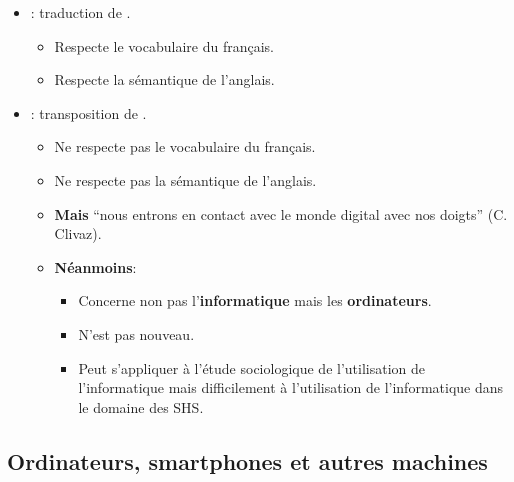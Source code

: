 \begin{slide}
	\begin{itemize}
		\item {} : traduction de .
		\begin{itemize}
			\item Respecte le vocabulaire du français.
			\item Respecte la sémantique de l'anglais.
		\end{itemize}
		
		\item {} : transposition de .
			\begin{itemize}
				\item Ne respecte pas le vocabulaire du français.
				\item Ne respecte pas la sémantique de l'anglais.
				\item \textbf{Mais} \enquote{nous entrons en contact avec le monde digital avec nos doigts} (C. Clivaz). %

				\item \textbf{Néanmoins}: %
				\begin{itemize}
					\item Concerne non pas l'\textbf{informatique} mais les \textbf{ordinateurs}.
					\item N'est pas nouveau.
					\item Peut s'appliquer à l'étude sociologique de l'utilisation de l'informatique mais difficilement à l'utilisation de l'informatique dans le domaine des SHS.
				\end{itemize}
			\end{itemize}
	\end{itemize}
\end{slide}
\subsection{Ordinateurs, smartphones et autres machines}



